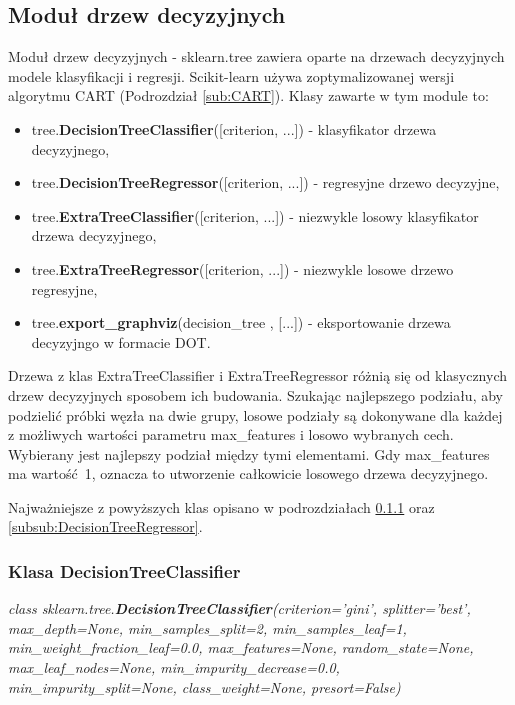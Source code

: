 \documentclass[10pt,a4paper]{article}
\begin{document}
\subsection{Moduł drzew decyzyjnych}
Moduł drzew decyzyjnych - sklearn.tree zawiera oparte na drzewach decyzyjnych modele klasyfikacji i regresji. Scikit-learn używa zoptymalizowanej wersji algorytmu CART (Podrozdział \ref{sub:CART}). Klasy zawarte w tym module to:
\begin{itemize}
	\item tree.\textbf{DecisionTreeClassifier}([criterion, ...]) - klasyfikator drzewa decyzyjnego,
	\item tree.\textbf{DecisionTreeRegressor}([criterion, ...]) - regresyjne drzewo decyzyjne,
	\item tree.\textbf{ExtraTreeClassifier}([criterion, ...]) - niezwykle losowy klasyfikator drzewa decyzyjnego,
	\item tree.\textbf{ExtraTreeRegressor}([criterion, ...]) - niezwykle losowe drzewo regresyjne,
	\item tree.\textbf{export\_graphviz}(decision\_tree , [...]) - eksportowanie drzewa decyzyjngo w formacie DOT.
\end{itemize}

Drzewa z klas ExtraTreeClassifier i ExtraTreeRegressor różnią się od klasycznych drzew decyzyjnych sposobem ich budowania. Szukając najlepszego podziału, aby podzielić próbki węzła na dwie grupy, losowe podziały są dokonywane dla każdej z możliwych wartości parametru max\_features i losowo wybranych cech. Wybierany jest najlepszy podział między tymi elementami. Gdy max\_features ma wartość~1, oznacza to utworzenie całkowicie losowego drzewa decyzyjnego.

Najważniejsze z powyższych klas opisano w podrozdziałach \ref{subsub:DecisionTreeClassifier} oraz \ref{subsub:DecisionTreeRegressor}.

\subsubsection{Klasa DecisionTreeClassifier}
\label{subsub:DecisionTreeClassifier}
\begin{flushleft}
	\textit{class sklearn.tree.\textbf{DecisionTreeClassifier}(criterion=’gini’, splitter=’best’, max\_depth=None, min\_samples\_split=2, min\_samples\_leaf=1, min\_weight\_fraction\_leaf=0.0, max\_features=None, random\_state=None, max\_leaf\_nodes=None, min\_impurity\_decrease=0.0, min\_impurity\_split=None, class\_weight=None, presort=False)}
\end{flushleft}\par
\vskip 0.2in
\end{document}
